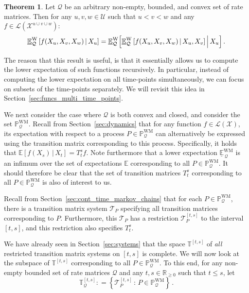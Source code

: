 \documentclass[10pt,a4paper]{paper}
\theoremstyle{definition}
\newtheorem{theorem}{Theorem}
\newcommand{\reals}{\mathbb{R}}
\newcommand{\realsnonneg}{\reals_{\geq 0}}
\newcommand{\states}{\mathcal{X}}
\newcommand{\processes}{\mathbb{P}}
\newcommand{\wmprocesses}{\processes^{\mathrm{WM}}}
\newcommand{\gambles}{\mathcal{L}}
\newcommand{\gamblesX}{\gambles(\states)}
\newcommand{\rateset}{\mathcal{Q}}
\newcommand{\coloneqq}{:\!=}
\begin{document}
\begin{theorem}\label{theorem:decomposition_multivar}
Let $\rateset$ be an arbitrary non-empty, bounded, and convex set of rate matrices. Then for any $u,v,w\in\mathcal{U}$ such that $u<v<w$ and any $f\in\gambles(\states^{u\cup v\cup w})$:
\begin{equation}\label{eq:lower_exp_factorizes}
\underline{\mathbb{E}}^{\mathrm{W}}_\rateset\left[f(X_u,X_v,X_w)\,\vert\,X_u\right] = \underline{\mathbb{E}}^{\mathrm{W}}_\rateset\Bigl[\underline{\mathbb{E}}^{\mathrm{W}}_\rateset\left[f(X_u,X_v,X_w)\,\vert\,X_u,X_v\right] \Big\vert\,X_u\Bigr]\,. 
\end{equation}
\end{theorem}
The reason that this result is useful, is that it essentially allows us to compute the lower expectation of such functions recursively. In particular, instead of computing the lower expectation on all time-points simultaneously, we can focus on subsets of the time-points separately. We will revisit this idea in Section~\ref{sec:funcs_multi_time_points}.

We next consider the case where $\rateset$ is both convex and closed, and consider the set $\wmprocesses_\rateset$. Recall from Section~\ref{sec:dynamics} that for any function $f\in\gamblesX$, its expectation with respect to a process $P\in\wmprocesses_\rateset$ can alternatively be expressed using the transition matrix corresponding to this process. Specifically, it holds that $\mathbb{E}[f(X_s)\,\vert\,X_t]=T_t^sf$. Note furthermore that a lower expectation $\underline{\mathbb{E}}_{\,\rateset}^{\mathrm{WM}}$ is an infimum over the set of expectations $\mathbb{E}$ corresponding to all $P\in\wmprocesses_\rateset$. It should therefore be clear that the set of transition matrices $T_t^s$ corresponding to all $P\in\wmprocesses_\rateset$ is also of interest to us.

Recall from Section~\ref{sec:cont_time_markov_chains} that for each $P\in\wmprocesses_\rateset$, there is a transition matrix system $\mathcal{T}_P$ specifying all transition matrices corresponding to $P$. Furthermore, this $\mathcal{T}_P$ has a restriction $\mathcal{T}_P^{[t,s]}$ to the interval $[t,s]$, and this restriction also specifies $T_t^s$. 

We have already seen in Section~\ref{sec:systems} that the space $\mathbb{T}^{[t,s]}$ of \emph{all} restricted transition matrix systems on $[t,s]$ is complete. We will now look at the subspace of $\mathbb{T}^{[t,s]}$ corresponding to all $P\in\wmprocesses_\rateset$. To this end, for any non-empty bounded set of rate matrices $\rateset$ and any $t,s\in\realsnonneg$ such that $t\leq s$, let
\begin{equation*}
\mathbb{T}_\rateset^{[t,s]} \coloneqq \left\{\mathcal{T}_P^{[t,s]}\,:\,P\in\wmprocesses_\rateset\right\}\,.
\end{equation*}
\end{document}
